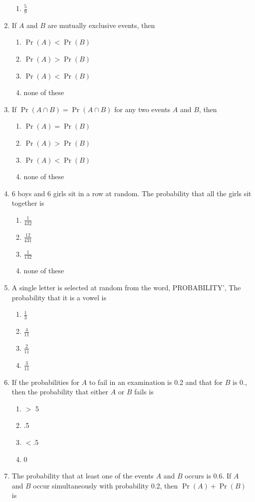 \documentclass[12pt]{article}
\providecommand{\pr}[1]{\ensuremath{\Pr\left(#1\right)}}
\begin{document}
\begin{enumerate}[resume]
\begin{enumerate}
\item $\frac{5}{9}$
\end{enumerate}
\item If $A$ and $B$ are mutually exclusive events, then
\begin{enumerate}
	\item $\pr{A}<\pr{B}$
	\item $\pr{A}>\pr{B}$
	\item $\pr{A}<\pr{B}$
\item none of these
\end{enumerate}
\item If $\pr {A\cap B}=\pr{A\cap B}$ for any two events $A$ and $B$, then 
\begin{enumerate}
	\item $\pr{A}=\pr{B}$
	\item $\pr{A}>\pr{B}$
	\item $\pr{A}<\pr{B}$
\item none of these
\end{enumerate}
\item 6 boys and 6 girls sit in a row at random. The probability that all the girls sit together is
\begin{enumerate}
\item $\frac{1}{432}$
\item $\frac{12}{431}$
\item $\frac{1}{132}$
\item none of these
\end{enumerate}
\item A single letter is selected at random from the word, PROBABILITY', The probability that it is a vowel is
\begin{enumerate}
\item $\frac{1}{3}$
\item $\frac{4}{11}$
\item $\frac{2}{11}$
\item $\frac{3}{11}$
\end{enumerate}
\item If the probabilities for $A$ to fail in an examination is 0.2 and that for $B$ is 0., then the probability that either $A$ or $B$ fails is
\begin{enumerate}
\item $>$ 5 
\item .5
\item $<$.5
\item 0
\end{enumerate}
\item The probability that at least one of the events $A$ and $B$ occurs is 0.6. If $A$ and $B$ occur simultaneously with probability 0.2, then $\pr{A}+\pr{B}$ is 

\end{enumerate}
\end{document}
